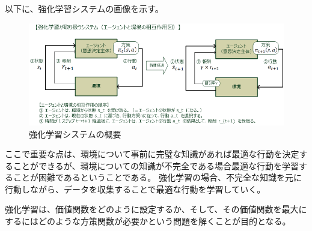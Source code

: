 \documentclass{ltjsarticle}
\begin{document}
\par
以下に、強化学習システムの画像を示す。
\begin{figure}[htbp]
  \centering
  \includegraphics[width=15cm]{./capture/reinforcement_learning.png}
  \caption{強化学習システムの概要}
  \label{reinforcement_learning}
\end{figure}

\par
ここで重要な点は、環境について事前に完璧な知識があれば最適な行動を決定することができるが、環境についての知識が不完全である場合最適な行動を学習することが困難であるということである。
強化学習の場合、不完全な知識を元に行動しながら、データを収集することで最適な行動を学習していく。
\par
強化学習は、価値関数をどのように設定するか、そして、その価値関数を最大にするにはどのような方策関数が必要かという問題を解くことが目的となる。
\end{document}
